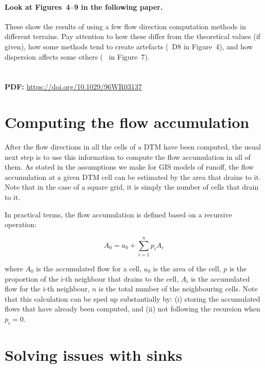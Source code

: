 \begin{kaobox}[frametitle=\faExternalLink\ To read or to watch.]
\paragraph{Look at Figures~4--9 in the following paper.} These show the results of using a few flow direction computation methods in different terrains.
Pay attention to how these differ from the theoretical values (if given), how some methods tend to create artefacts (\eg\ D8 in Figure~4), and how dispersion affects some others (\eg\ \citet{Quinn91} in Figure~7).
\\
\\
\\
\textbf{PDF:} \url{https://doi.org/10.1029/96WR03137}
\end{kaobox}


\section[Computing flow accumulation]{Computing the flow accumulation}%
\label{se:accumulation}

After the flow directions in all the cells of a DTM have been computed, the usual next step is to use this information to compute the flow accumulation in all of them.
As stated in the assumptions we make for GIS models of runoff, the flow accumulation at a given DTM cell can be estimated by the area that drains to it.
Note that in the case of a square grid, it is simply the number of cells that drain to it.

In practical terms, the flow accumulation is defined based on a recursive operation:

\begin{equation}
A_0 = a_0 + \sum_{i=1}^{n} p_i A_i
\end{equation}

where \(A_0\) is the accumulated flow for a cell, \(a_0\) is the area of the cell, \(p\) is the proportion of the i-th neighbour that drains to the cell, \(A_i\) is the accumulated flow for the i-th neighbour, \(n\) is the total number of the neighbouring cells.
Note that this calculation can be sped up substantially by: (i) storing the accumulated flows that have already been computed, and (ii) not following the recursion when \(p_i = 0\).

\section{Solving issues with sinks}

